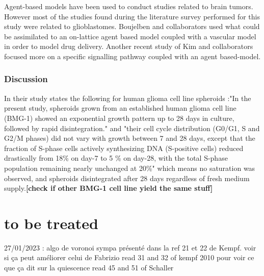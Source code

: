 \documentclass[11pt,a4paper]{article}
\begin{document}
Agent-based models have been used to conduct studies related to brain tumors. However most of the studies found during the literature survey performed for this study were related to glioblastomes. Boujelben and collaborators used what could be assimilated to an on-lattice agent based model coupled with a vascular model in order to model drug delivery.\cite{Boujelben2016} Another recent study of Kim and collaborators focused more on a specific signalling pathway coupled with an agent based-model.\cite{Kim2015}



\subsubsection{Discussion}
In their study \cite{Khaitan2006} states the following for human glioma cell line spheroids :"In the present study, spheroids grown from an established human glioma cell line (BMG-1) showed an exponential growth pattern up to 28 days in culture, followed by rapid disintegration." and "their cell cycle distribution (G0/G1, S and G2/M phases) did not vary with growth between 7 and 28 days, except that the fraction of S-phase cells actively synthesizing DNA (S-positive cells) reduced drastically from 18\% on day-7 to 5 \% on day-28, with the total S-phase population remaining nearly unchanged at 20\%"\cite{Khaitan2006} which means no saturation was observed, and spheroids disintegrated after 28 days regardless of fresh medium supply.\textbf{[check if other BMG-1 cell line yield the same stuff]}







\section*{to be treated}

27/01/2023 : algo de voronoi sympa présenté dans la ref 21 et 22 de Kempf. voir si ça peut améliorer celui de Fabrizio
	read 31 and 32 of kempf 2010 pour voir ce que ça dit sur la quiescence
	read 45  and 51 of Schaller
\end{document}
